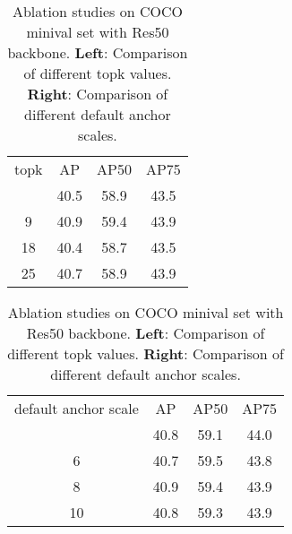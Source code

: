 \documentclass[runningheads]{llncs}
\begin{document}
\begin{table}
\begin{center}
\caption {Ablation studies on COCO minival set with Res50 backbone. \textbf{Left}: Comparison of different topk  values. \textbf{Right}: Comparison of different default anchor scales.}
\begin{minipage}{.4\linewidth}
\centering
\begin{tabular}{c|ccc}
\hline\noalign{\smallskip}
topk  & AP & AP50 & AP75 \\
\noalign{\smallskip}
\hline
5 & 40.5 & 58.9 & 43.5\\
 9 & 40.9 & 59.4 & 43.9\\
 18 & 40.4 & 58.7 & 43.5\\
 25 & 40.7 & 58.9 & 43.9\\
\hline
\end{tabular}
\label{table:extra_ablation_topk}
\end{minipage}\begin{minipage}{.6\linewidth}
\centering
\begin{tabular}{c|ccc}
\hline\noalign{\smallskip}
default anchor scale & AP & AP50 & AP75 \\
\noalign{\smallskip}
\hline
4 & 40.8 & 59.1 & 44.0\\
 6 & 40.7 & 59.5 & 43.8\\
 8 & 40.9 & 59.4 & 43.9\\
 10 & 40.8 & 59.3 & 43.9\\
\hline
\end{tabular}
\label{table:extra_ablation_default_anchor_scale}
\end{minipage}\end{center}
\end{table}
\end{document}
